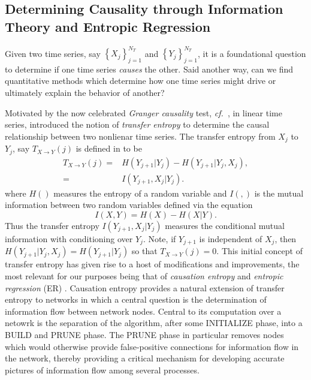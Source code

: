 \documentclass[a4paper,11pt]{article}
\newcommand{\cf}{{\it cf.}~}
\begin{document}
\subsection{Determining Causality through Information Theory and Entropic Regression}

Given two time series, say $\left\{X_{j}\right\}_{j=1}^{N_{T}}$ and $\left\{Y_{j}\right\}_{j=1}^{N_{T}}$, it is a foundational question to determine if one time series {\it causes} the other.  Said another way, can we find quantitative methods which determine how one time series might drive or ultimately explain the behavior of another?  

Motivated by the now celebrated {\it Granger causality} test, \cf \cite{granger}, in linear time series, \cite{schreiber} introduced the notion of {\it transfer entropy} to determine the causal relationship between two nonlienar time series.  The transfer entropy from $X_{j}$ to $Y_{j}$, say $T_{X\rightarrow Y}(j)$ is defined in \cite{schreiber} to be 
\begin{align}
T_{X\rightarrow Y}(j) = & H\left(Y_{j+1}|Y_{j}\right) - H\left(Y_{j+1}|Y_{j}, X_{j}\right),  \\
= & I\left(Y_{j+1}, X_{j}|Y_{j} \right).
\end{align}
where $H()$ measures the entropy of a random variable and $I(,)$ is the mutual information between two random variables defined via the equation
\begin{equation}
I(X,Y) = H(X) - H(X|Y).  
\end{equation}
Thus the transfer entropy $I(Y_{j+1},X_{j}|Y_{j})$ measures the conditional mutual information with conditioning over $Y_{j}$.  Note, if $Y_{j+1}$ is independent of $X_{j}$, then $H(Y_{j+1}|Y_{j},X_{j}) = H(Y_{j+1}|Y_{j})$ so that $T_{X\rightarrow Y}(j) = 0$.  This initial concept of transfer entropy has given rise to a host of modifications and improvements, the most relevant for our purposes being that of {\it causation entropy} \cite{bollt} and {\it entropic regression} (ER) \cite{bollt2}.  Causation entropy provides a natural extension of transfer entropy to networks in which a central question is the determination of information flow between network nodes.  Central to its computation over a netowrk is the separation of the algorithm, after some INITIALIZE phase, into a BUILD and PRUNE phase.  The PRUNE phase in particular removes nodes which would otherwise provide false-positive connections for information flow in the network, thereby providing a critical mechanism for developing accurate pictures of information flow among several processes.  
\end{document}
